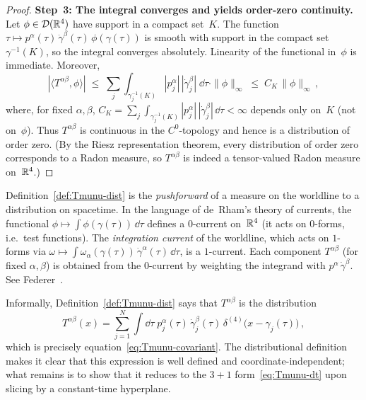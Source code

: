 \begin{proof}
  \medskip\noindent
  \textbf{Step~3: The integral converges and yields
  order-zero continuity.}\;
  Let $\phi \in \mathcal{D}(\mathbb{R}^{4})$ have
  support in a compact set~$K$.  The function
  $\tau \mapsto p^\alpha(\tau)\,\dot\gamma^\beta(\tau)\,
  \phi(\gamma(\tau))$ is smooth with support in the compact set
  $\gamma^{-1}(K)$, so the integral converges absolutely.
  Linearity of the functional in~$\phi$ is immediate.  Moreover,
  \[
    |\langle T^{\alpha\beta}, \phi\rangle|
      \;\leq\; \sum_j \int_{\gamma_j^{-1}(K)}
        |p_j^\alpha|\,|\dot\gamma_j^\beta|\;\dd\tau
        \cdot \|\phi\|_\infty
      \;\leq\; C_K\,\|\phi\|_\infty\,,
  \]
  where, for fixed $\alpha,\beta$,
  $C_K = \sum_j \int_{\gamma_j^{-1}(K)}
  |p_j^\alpha|\,|\dot\gamma_j^\beta|\,\dd\tau < \infty$ depends
  only on~$K$ (not on~$\phi$).  Thus $T^{\alpha\beta}$ is
  continuous in the $C^0$-topology and hence is a distribution of
  order zero.  (By the Riesz representation theorem, every
  distribution of order zero corresponds to a Radon measure,
  so $T^{\alpha\beta}$ is indeed a tensor-valued Radon measure
  on~$\mathbb{R}^{4}$.)
\end{proof}

\begin{remark}
  Definition~\ref{def:Tmunu-dist} is the \emph{pushforward} of a
  measure on the worldline to a distribution on spacetime.  In the
  language of de~Rham's theory of currents, the functional
  $\phi \mapsto \int \phi(\gamma(\tau))\,\dd\tau$ defines a
  $0$-current on~$\mathbb{R}^{4}$ (it acts on $0$-forms, i.e.\ test
  functions).  The \emph{integration current} of the worldline,
  which acts on $1$-forms via
  $\omega \mapsto \int \omega_\alpha(\gamma(\tau))\,
  \dot\gamma^\alpha(\tau)\,\dd\tau$, is a $1$-current.
  Each component $T^{\alpha\beta}$ (for fixed
  $\alpha,\beta$) is obtained from the $0$-current by
  weighting the integrand with
  $p^\alpha\,\dot\gamma^\beta$.  See
  Federer~\cite[\S4.1]{Federer69}.
\end{remark}

\noindent
Informally, Definition~\ref{def:Tmunu-dist} says that
$T^{\alpha\beta}$ is the distribution
\begin{equation}\label{eq:Tmunu-delta4-add}
  T^{\alpha\beta}(x) = \sum_{j=1}^{N} \int\!\dd\tau\;
    p_j^\alpha(\tau)\,\dot\gamma_j^\beta(\tau)\,
    \delta^{(4)}\!\bigl(x - \gamma_j(\tau)\bigr)\,,
\end{equation}
which is precisely equation~\eqref{eq:Tmunu-covariant}.  The
distributional definition makes it clear that this expression is
well defined and coordinate-independent; what remains is to show
that it reduces to the $3{+}1$
form~\eqref{eq:Tmunu-dt} upon slicing by a constant-time
hyperplane.

